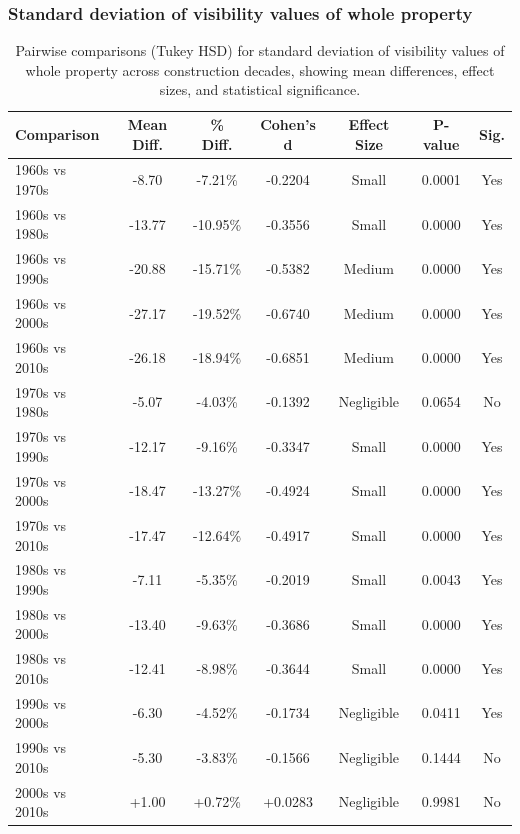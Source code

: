 \subsubsection{Standard deviation of visibility values of whole property}
\begin{table}[htbp]
    \centering
    \begin{tabular}{l|c|c|c|c|c|c}
    \hline
    \textbf{Comparison} & \textbf{Mean Diff.} & \textbf{\% Diff.} & \textbf{Cohen's d} & \textbf{Effect Size} & \textbf{P-value} & \textbf{Sig.} \\
    \hline
    1960s vs 1970s & -8.70 & -7.21\% & -0.2204 & Small & 0.0001 & Yes \\
    1960s vs 1980s & -13.77 & -10.95\% & -0.3556 & Small & 0.0000 & Yes \\
    1960s vs 1990s & -20.88 & -15.71\% & -0.5382 & Medium & 0.0000 & Yes \\
    1960s vs 2000s & -27.17 & -19.52\% & -0.6740 & Medium & 0.0000 & Yes \\
    1960s vs 2010s & -26.18 & -18.94\% & -0.6851 & Medium & 0.0000 & Yes \\
    1970s vs 1980s & -5.07 & -4.03\% & -0.1392 & Negligible & 0.0654 & No \\
    1970s vs 1990s & -12.17 & -9.16\% & -0.3347 & Small & 0.0000 & Yes \\
    1970s vs 2000s & -18.47 & -13.27\% & -0.4924 & Small & 0.0000 & Yes \\
    1970s vs 2010s & -17.47 & -12.64\% & -0.4917 & Small & 0.0000 & Yes \\
    1980s vs 1990s & -7.11 & -5.35\% & -0.2019 & Small & 0.0043 & Yes \\
    1980s vs 2000s & -13.40 & -9.63\% & -0.3686 & Small & 0.0000 & Yes \\
    1980s vs 2010s & -12.41 & -8.98\% & -0.3644 & Small & 0.0000 & Yes \\
    1990s vs 2000s & -6.30 & -4.52\% & -0.1734 & Negligible & 0.0411 & Yes \\
    1990s vs 2010s & -5.30 & -3.83\% & -0.1566 & Negligible & 0.1444 & No \\
    2000s vs 2010s & +1.00 & +0.72\% & +0.0283 & Negligible & 0.9981 & No \\
    \hline
    \end{tabular}
    \caption{Pairwise comparisons (Tukey HSD) for standard deviation of visibility values of whole property across construction decades, showing mean differences, effect sizes, and statistical significance.}
    \label{tab:std_vga_tukey_hsd}
\end{table}

